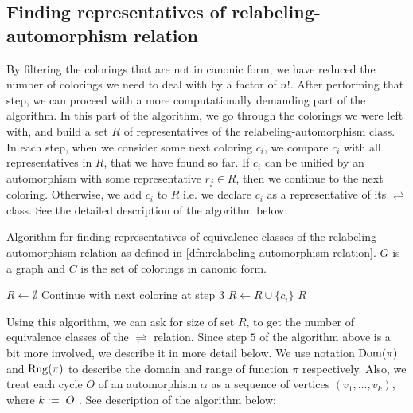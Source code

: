 \subsection{Finding representatives of relabeling-automorphism relation}

By filtering the colorings that are not in canonic form, we have reduced the number of colorings we need to deal with by a factor of $n!$. After performing that step, we can proceed with a more computationally demanding part of the algorithm. In this part of the algorithm, we go through the colorings we were left with, and build a set $R$ of representatives of the relabeling-automorphism class. In each step, when we consider some next coloring $c_i$, we compare $c_i$ with all representatives in $R$, that we have found so far. If $c_i$ can be unified by an automorphism with some representative $r_j \in R$, then we continue to the next coloring. Otherwise, we add $c_i$ to $R$ i.e. we declare $c_i$ as a representative of its $\rightleftharpoons$ class. See the detailed description of the algorithm below:

\begin{algorithm}[H]
    \caption{Algorithm for finding representatives of equivalence classes of the relabeling-automorphism relation as defined in \ref{dfn:relabeling-automorphism-relation}. $G$ is a graph and $C$ is the set of colorings in canonic form.} 
    \begin{algorithmic}[1]
            \State $R \gets \emptyset$
                        \State Continue with next coloring at step 3
                    \EndIf
                \EndFor
                \State $R \gets R \cup \{c_i\}$
            \EndFor
            \State \Return $R$
        \EndFunction
    \end{algorithmic}
    \label{alg:representatives-of-relabeling-automorphism-relation}
\end{algorithm}

Using this algorithm, we can ask for size of set $R$, to get the number of equivalence classes of the $\rightleftharpoons$ relation. Since step $5$ of the algorithm above is a bit more involved, we describe it in more detail below. We use notation $\operatorname{Dom}(\pi)$ and $\operatorname{Rng}(\pi)$ to describe the domain and range of function $\pi$ respectively. Also, we treat each cycle $O$ of an automorphism $\alpha$ as a sequence of vertices $(v_1,\ldots,v_k)$, where $k := \left|{O}\right|$. See description of the algorithm below:

